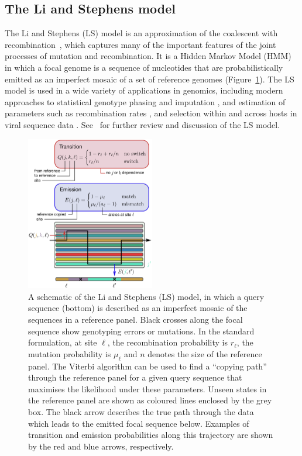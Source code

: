 \documentclass{article}
\begin{document}
\subsection{The Li and Stephens model}
\label{sec:ls}
The Li and Stephens (LS) model \citep{Li2003-ib}  is an approximation of the
coalescent with recombination~\citep{Hudson1983-properties}, which captures
many of the important features of the joint processes of mutation and
recombination. It is a Hidden Markov Model (HMM) in which a focal genome is a
sequence of nucleotides that are probabilistically emitted as
an imperfect mosaic of a set of reference genomes
(Figure~\ref{fig:ls_diagram}).
The LS model is used in a wide variety
of applications in genomics, including modern approaches to
statistical genotype phasing and imputation
\citep{Delaneau2019-wl,Browning2021-cg,Browning2018-nk,Rubinacci2020-pa},
and estimation of parameters such as
recombination rates \citep[e.g.][]{Hinch2011-tz},
and selection within and across hosts in viral
sequence data \citep[e.g.][]{Palmer2019-wa}.
See~\cite{Mcvean2019-linkage} for further review and discussion
of the LS model.

\begin{figure} \centering
\includegraphics[width=0.5\textwidth]{figures/ls_diagram_covid.pdf}
\caption{\label{fig:ls_diagram} A schematic of the Li and Stephens (LS)
model, in which a query sequence (bottom) is described as an
imperfect mosaic of the sequences in a reference panel.
Black crosses along the focal sequence show genotyping
errors or mutations.
In the standard formulation, at site $\ell$, the recombination probability is $r_\ell$,
the mutation probability is $\mu_\ell$ and $n$
denotes the size of the reference panel.
The Viterbi algorithm can be used to find a
``copying path'' through the reference panel for a given query sequence that
maximises the likelihood under these parameters. Unseen states in the reference panel are shown as coloured lines enclosed by
the grey box. The black arrow describes the true path through the data which leads to the emitted
focal sequence below. Examples of transition and
emission probabilities along this trajectory are shown by the red and blue
arrows, respectively.
}
\end{figure}
\end{document}
